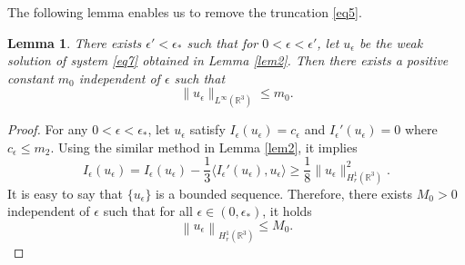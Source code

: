 \documentclass[12pt]{amsart}
\numberwithin{equation}{section}
\newtheorem{lemma}[theorem]{Lemma}
\theoremstyle{definition}
\begin{document}
The following lemma enables us to remove the truncation \eqref{eq5}.
\begin{lemma}\label{lem3}
	 There exists $\epsilon'<\epsilon_{\ast}$ such that for $0<\epsilon<\epsilon'$, let $u_{\epsilon}$ be the weak solution of system \eqref{eq7} obtained in Lemma \ref{lem2}. Then there exists a positive constant $m_0$ independent of $\epsilon$ such that
	\begin{equation}
	    \label{u_epsion}
	\|u_{\epsilon}\|_{L^{\infty}(\mathbb R^3)}\leq m_0.\end{equation}
\end{lemma}
\begin{proof}
		For any $0<\epsilon<\epsilon_*$, let $u_\epsilon$ satisfy $I_{\epsilon}(u_{\epsilon})=c_{\epsilon}$ and $I_{\epsilon}'(u_{\epsilon})=0$ where $c_{\epsilon}\leq m_2$. Using the similar method in Lemma \ref{lem2}, it implies
		\begin{equation*}
	I_{\epsilon}(u_\epsilon)=I_{\epsilon}(u_\epsilon)-\frac{1}{3}\langle I_{\epsilon}'(u_\epsilon),u_\epsilon\rangle\geq \frac{1}{8}\|u_\epsilon\|^{2}_{H^1_r(\mathbb R^3)}.
	\end{equation*}
	It is easy to say that $\{u_{\epsilon}\}$ is a bounded sequence. Therefore, there exists $M_{0}> 0$ independent of $\epsilon $ such that for all $\epsilon \in(0,\epsilon_*)$, it holds
		\begin{equation*}
			\left\| u_{\epsilon }\right\|_{H_{r}^{1}\left ( \mathbb{R}^{3} \right )}\leq M_{0}.
		\end{equation*}
	

\end{proof}
\end{document}
